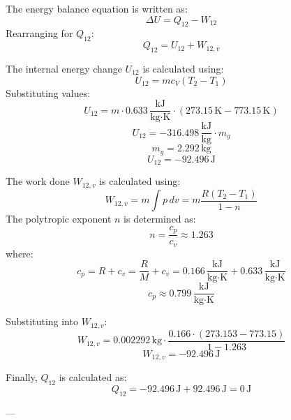 The energy balance equation is written as:  
\[
\Delta U = Q_{12} - W_{12}
\]  
Rearranging for \( Q_{12} \):  
\[
Q_{12} = U_{12} + W_{12,v}
\]  

The internal energy change \( U_{12} \) is calculated using:  
\[
U_{12} = m c_V (T_2 - T_1)
\]  
Substituting values:  
\[
U_{12} = m \cdot 0.633 \, \frac{\text{kJ}}{\text{kg·K}} \cdot (273.15 \, \text{K} - 773.15 \, \text{K})
\]  
\[
U_{12} = -316.498 \, \frac{\text{kJ}}{\text{kg}} \cdot m_g
\]  
\[
m_g = 2.292 \, \text{kg}
\]  
\[
U_{12} = -92.496 \, \text{J}
\]  

The work done \( W_{12,v} \) is calculated using:  
\[
W_{12,v} = m \int p \, dv = m \frac{R (T_2 - T_1)}{1 - n}
\]  
The polytropic exponent \( n \) is determined as:  
\[
n = \frac{c_p}{c_v} \approx 1.263
\]  
where:  
\[
c_p = R + c_v = \frac{R}{M} + c_v = 0.166 \, \frac{\text{kJ}}{\text{kg·K}} + 0.633 \, \frac{\text{kJ}}{\text{kg·K}}
\]  
\[
c_p \approx 0.799 \, \frac{\text{kJ}}{\text{kg·K}}
\]  

Substituting into \( W_{12,v} \):  
\[
W_{12,v} = 0.002292 \, \text{kg} \cdot \frac{0.166 \cdot (273.153 - 773.15)}{1 - 1.263}
\]  
\[
W_{12,v} = -92.496 \, \text{J}
\]  

Finally, \( Q_{12} \) is calculated as:  
\[
Q_{12} = -92.496 \, \text{J} + 92.496 \, \text{J} = 0 \, \text{J}
\]  

---